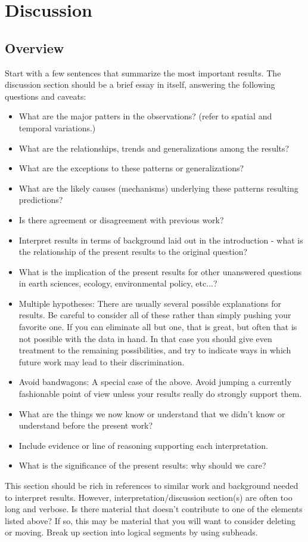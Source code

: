 \chapter{Discussion}
\section{Overview}
Start with a few sentences that summarize the most important results. The discussion section should be a brief essay in itself, answering the following questions and caveats:
\begin{itemize}
  \item What are the major patters in the observations? (refer to spatial and temporal variations.)
  \item What are the relationships, trends and generalizations among the results?
  \item What are the exceptions to these patterns or generalizations?
  \item What are the likely causes (mechanisms) underlying these patterns resulting predictions?
  \item Is there agreement or disagreement with previous work?
  \item Interpret results in terms of background laid out in the introduction - what is the relationship of the present results to the original question?
  \item What is the implication of the present results for other unanswered questions in earth sciences, ecology, environmental policy, etc...?
  \item Multiple hypotheses: There are usually several possible explanations for results. Be careful to consider all of these rather than simply pushing your favorite one. If you can eliminate all but one, that is great, but often that is not possible with the data in hand. In that case you should give even treatment to the remaining possibilities, and try to indicate ways in which future work may lead to their discrimination.
  \item Avoid bandwagons: A special case of the above. Avoid jumping a currently fashionable point of view unless your results really do strongly support them.
  \item What are the things we now know or understand that we didn't know or understand before the present work?
  \item Include evidence or line of reasoning supporting each interpretation.
  \item What is the significance of the present results: why should we care?
\end{itemize}
This section should be rich in references to similar work and background needed to interpret results. However, interpretation/discussion section(s) are often too long and verbose. Is there material that doesn't contribute to one of the elements listed above? If so, this may be material that you will want to consider deleting or moving. Break up section into logical segments by using subheads.





